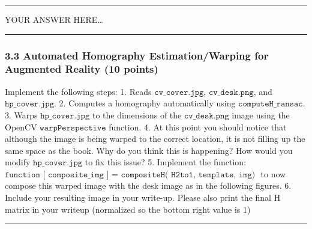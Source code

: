 \documentclass[11pt]{article}
\begin{document}
    \begin{center}\rule{0.5\linewidth}{0.5pt}\end{center}

YOUR ANSWER HERE\ldots{}

\begin{center}\rule{0.5\linewidth}{0.5pt}\end{center}

    \hypertarget{automated-homography-estimationwarping-for-augmented-reality-10-points}{%
\subsubsection{3.3 Automated Homography Estimation/Warping for Augmented
Reality (10
points)}\label{automated-homography-estimationwarping-for-augmented-reality-10-points}}

Implement the following steps: 1. Reads $\texttt{cv_cover.jpg}$,
$\texttt{cv_desk.png}$, and $\texttt{hp_cover.jpg}$. 2. Computes a
homography automatically using $\texttt{computeH_ransac}$. 3. Warps
\(\texttt{hp_cover.jpg}\) to the dimensions of the
\(\texttt{cv_desk.png}\) image using the OpenCV
\(\texttt{warpPerspective}\) function. 4. At this point you should
notice that although the image is being warped to the correct location,
it is not filling up the same space as the book. Why do you think this
is happening? How would you modify \(\texttt{hp_cover.jpg}\) to fix this
issue? 5. Implement the function:
\(\texttt{function [ composite_img ] = compositeH( H2to1, template, img) }\)
to now compose this warped image with the desk image as in the following
figures. 6. Include your resulting image in your write-up. Please also
print the final H matrix in your writeup (normalized so the bottom right
value is 1)

    \begin{center}\rule{0.5\linewidth}{0.5pt}\end{center}
\end{document}
